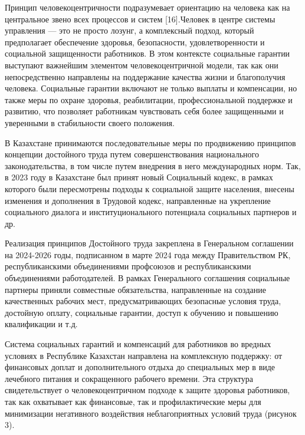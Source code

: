 \begin{multicols}{2}

Принцип человекоцентричности подразумевает ориентацию на человека как на
центральное звено всех процессов и систем {[}16{]}.Человек в центре
системы управления --- это не просто лозунг, а комплексный подход,
который предполагает обеспечение здоровья, безопасности,
удовлетворенности и социальной защищенности работников. В этом контексте
социальные гарантии выступают важнейшим элементом человекоцентричной
модели, так как они непосредственно направлены на поддержание качества
жизни и благополучия человека. Социальные гарантии включают не только
выплаты и компенсации, но также меры по охране здоровья, реабилитации,
профессиональной поддержке и развитию, что позволяет работникам
чувствовать себя более защищенными и уверенными в стабильности своего
положения.

В Казахстане принимаются последовательные меры по продвижению принципов
концепции достойного труда путем совершенствования национального
законодательства, в том числе путем внедрения в него международных норм.
Так, в 2023 году в Казахстане был принят новый Социальный кодекс, в
рамках которого были пересмотрены подходы к социальной защите населения,
внесены изменения и дополнения в Трудовой кодекс, направленные на
укрепление социального диалога и институционального потенциала
социальных партнеров и др.

Реализация принципов Достойного труда закреплена в Генеральном
соглашении на 2024-2026 годы, подписанном в марте 2024 года между
Правительством РК, республиканскими объединениями профсоюзов и
республиканскими объединениями работодателей. В рамках Генерального
соглашения социальные партнеры приняли совместные обязательства,
направленные на создание качественных рабочих мест, предусматривающих
безопасные условия труда, достойную оплату, социальные гарантии, доступ
к обучению и повышению квалификации и т.д.

Система социальных гарантий и компенсаций для работников во вредных
условиях в Республике Казахстан направлена на комплексную поддержку: от
финансовых доплат и дополнительного отдыха до специальных мер в виде
лечебного питания и сокращенного рабочего времени. Эта структура
свидетельствует о человекоцентричном подходе к защите здоровья
работников, так как охватывает как финансовые, так и профилактические
меры для минимизации негативного воздействия неблагоприятных условий
труда (рисунок 3).

\end{multicols}


